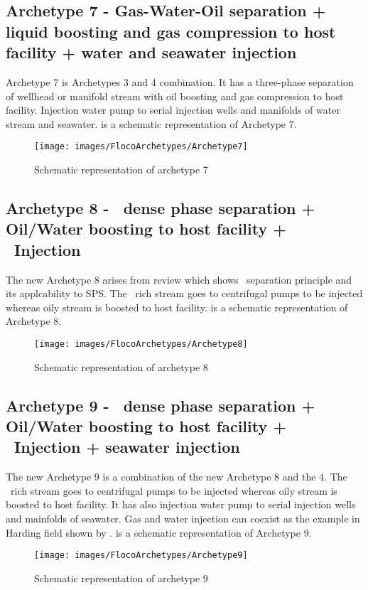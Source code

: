 \subsection{Archetype 7 - Gas-Water-Oil separation + liquid boosting and gas compression to host facility + water and seawater injection}
Archetype 7 is Archetypes 3 and 4 combination. It has a three-phase separation of wellhead or manifold stream with oil boosting and gas compression to host facility. Injection water pump to serial injection wells and manifolds of water stream and seawater.   is a schematic representation of Archetype 7.
\begin{figure}[H]
\centering
\texttt{[image: images/FlocoArchetypes/Archetype7]}
\caption{Schematic representation of archetype 7}
\label{fig:Archetype7}
\end{figure}

\subsection{Archetype 8 - \CO~dense phase separation + Oil/Water boosting to host facility + \CO~Injection}
The new Archetype 8 arises from  review which shows \HiSep~separation principle and its applcability to SPS. The \CO~rich stream goes to centrifugal pumps to be injected whereas oily stream is boosted to host facility.
 is a schematic representation of Archetype 8.
 \begin{figure}[H]
\centering
\texttt{[image: images/FlocoArchetypes/Archetype8]}
\caption{Schematic representation of archetype 8}
\label{fig:Archetype8}
\end{figure}

\subsection{Archetype 9 - \CO~dense phase separation + Oil/Water boosting to host facility + \CO~Injection + seawater injection}
The new Archetype 9 is a combination of the new Archetype 8 and the 4. The \CO~rich stream goes to centrifugal pumps to be injected whereas oily stream is boosted to host facility. It has also injection water pump to serial injection wells and mainfolds of seawater. Gas and water injection can coexist as the example in Harding field shown by \citet{James2012}.  is a schematic representation of Archetype 9.
 \begin{figure}[H]
\centering
\texttt{[image: images/FlocoArchetypes/Archetype9]}
\caption{Schematic representation of archetype 9}
\label{fig:Archetype9}
\end{figure}

